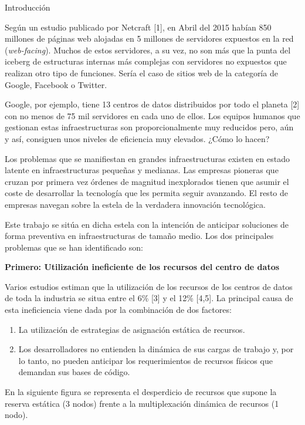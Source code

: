 \documentclass[a4paper,12pt,spanish,final]{epsc_tfc_pfc}
\begin{document}
\begin{intro}{Introducción}

  Según un estudio publicado por Netcraft [1], en Abril del 2015 habían 850 millones de páginas web alojadas en 5 millones de servidores expuestos en la red (\emph{web-facing}). Muchos de estos servidores, a su vez, no son más que la punta del iceberg de estructuras internas más complejas con servidores no expuestos que realizan otro tipo de funciones. Sería el caso de sitios web de la categoría de Google, Facebook o Twitter.

  Google, por ejemplo, tiene 13 centros de datos distribuidos por todo el planeta [2] con no menos de 75 mil servidores en cada uno de ellos. Los equipos humanos que gestionan estas infraestructuras son proporcionalmente muy reducidos pero, aún y así, consiguen unos niveles de eficiencia muy elevados. ¿Cómo lo hacen?

Los problemas que se manifiestan en grandes infraestructuras existen en estado latente en infraestructuras pequeñas y medianas. Las empresas pioneras que cruzan por primera vez órdenes de magnitud inexplorados tienen que asumir el coste de desarrollar la tecnología que les permita seguir avanzando. El resto de empresas navegan sobre la estela de la verdadera innovación tecnológica.

Este trabajo se sitúa en dicha estela con la intención de anticipar soluciones de forma preventiva en infraestructuras de tamaño medio. Los dos principales problemas que se han identificado son:

\textbf{Primero: Utilización ineficiente de los recursos del centro de datos}

Varios estudios estiman que la utilización de los recursos de los centros de datos de toda la industria se situa entre el 6\% [3] y el 12\% [4,5]. La principal causa de esta ineficiencia viene dada por la combinación de dos factores:
\begin{enumerate}
  \item La utilización de estrategias de asignación estática de recursos.
  \item Los desarrolladores no entienden la dinámica de sus cargas de trabajo y, por lo tanto, no pueden anticipar los requerimientos de recursos físicos que demandan sus bases de código.
\end{enumerate}

En la siguiente figura se representa el desperdicio de recursos que supone la reserva estática (3 nodos) frente a la multiplexación dinámica de recursos (1 nodo).


\end{intro}
\end{document}
